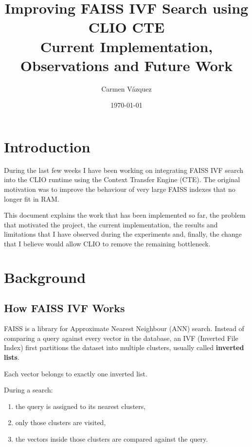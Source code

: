 \documentclass[11pt]{article}
\title{Improving FAISS IVF Search using CLIO CTE\\
Current Implementation, Observations and Future Work}
\author{Carmen Vázquez}
\date{\today}
\begin{document}
\maketitle

\tableofcontents

\newpage

\section{Introduction}

During the last few weeks I have been working on integrating
FAISS IVF search into the CLIO runtime using the Context Transfer
Engine (CTE). The original motivation was to improve the behaviour
of very large FAISS indexes that no longer fit in RAM.

This document explains the work that has been implemented so far,
the problem that motivated the project, the current implementation,
the results and limitations that I have observed during the
experiments and, finally, the change that I believe would allow CLIO
to remove the remaining bottleneck.

\section{Background}

\subsection{How FAISS IVF Works}

FAISS is a library for Approximate Nearest Neighbour (ANN) search.
Instead of comparing a query against every vector in the database,
an IVF (Inverted File Index) first partitions the dataset into
multiple clusters, usually called \textbf{inverted lists}.

Each vector belongs to exactly one inverted list.

During a search:

\begin{enumerate}
\item the query is assigned to its nearest clusters,
\item only those clusters are visited,
\item the vectors inside those clusters are compared against the query.
\end{enumerate}
\end{document}

